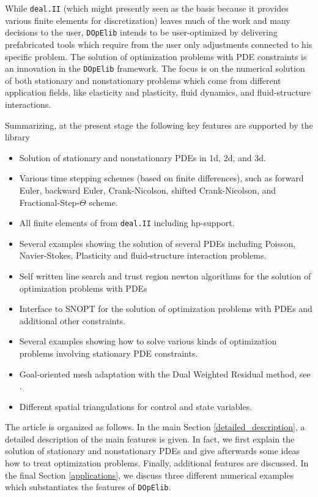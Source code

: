 \documentclass[prodmode,acmtoms]{acmsmall}
\numberwithin{equation}{section}
\newcommand{\deal}{\texttt{deal.II}}
\newcommand{\dope}{\texttt{DOpElib}}
\begin{document}
While \deal{} (which might presently seen as the basis because 
it provides various finite elements for discretization) 
leaves much of the work and many
decisions to the user, \dope{} intends to be user-optimized by delivering
prefabricated tools which require from the user only adjustments connected
to his specific problem. The solution of optimization problems with PDE
constraints is an innovation in the \dope{} framework.
The focus is on the numerical solution of both stationary and nonstationary
problems which come from different application fields, like elasticity and
plasticity, fluid dynamics, and fluid-structure interactions.

Summarizing, 
at the present stage the following key features are supported by the library
\begin{itemize}
\item Solution of stationary and nonstationary PDEs in 1d, 2d, and 3d.
\item Various time stepping schemes (based on finite differences), 
  such as forward Euler, backward Euler,
  Crank-Nicolson, shifted Crank-Nicolson, and Fractional-Step-$\Theta$ scheme.
\item All finite elements of from \deal{} including hp-support.
\item Several examples showing the solution of several PDEs including
   Poisson, Navier-Stokes, Plasticity and fluid-structure interaction problems. 
\item Self written line search and trust region newton algorithms for the 
   solution of optimization problems with PDEs \cite{NoWr00}
\item Interface to SNOPT for the solution of optimization problems with PDEs and
  additional other constraints.
\item Several examples showing how to solve various kinds of optimization problems
  involving stationary PDE constraints.
\item Goal-oriented mesh adaptation with the Dual Weighted Residual method, see \cite{BR03}.
\item Different spatial triangulations for control and state variables.
\end{itemize}

The article is organized as follows. In the main Section
\ref{detailed_description}, a detailed description of 
the main features is given. In fact, we first explain the solution 
of stationary and nonstationary PDEs and give afterwards some 
ideas how to treat optimization problems. Finally, 
additional features are discussed. In the final Section
\ref{applications}, we discuss three different numerical 
examples which substantiates the features of \dope{}. 
\end{document}

